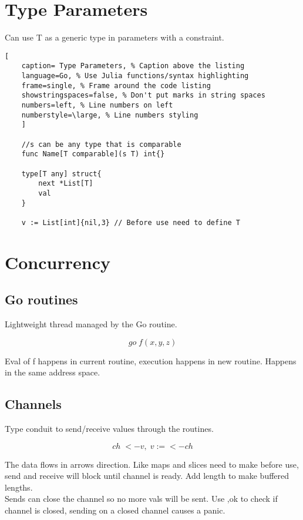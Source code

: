 \documentclass[11pt]{scrartcl} %
\begin{document}
\section{Type Parameters}

Can use T as a generic type in parameters with a constraint.

\begin{lstlisting}[
	caption= Type Parameters, % Caption above the listing
	language=Go, % Use Julia functions/syntax highlighting
	frame=single, % Frame around the code listing
	showstringspaces=false, % Don't put marks in string spaces
	numbers=left, % Line numbers on left
	numberstyle=\large, % Line numbers styling
	]

	//s can be any type that is comparable
	func Name[T comparable](s T) int{} 

	type[T any] struct{
		next *List[T]
		val
	} 
	
	v := List[int]{nil,3} // Before use need to define T

\end{lstlisting}

\section{Concurrency}

\subsection{Go routines}

Lightweight thread managed by the Go routine.

\[ go\;f(x,y,z) \]

Eval of f happens in current routine, execution happens in new routine. Happens in the 
same address space.

\subsection{Channels}

Type conduit to send/receive values through the routines.

\[ ch\;<-v,\;v:=<-ch \]

The data flows in arrows direction. Like maps and slices need to make before use, send
and receive will block until channel is ready. Add length to make buffered lengths.\\

Sends can close the channel so no more vals will be sent. Use ,ok to check if channel is closed,
sending on a closed channel causes a panic.
\end{document}
